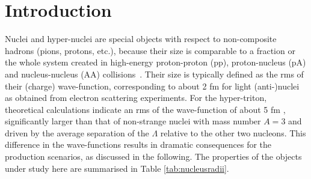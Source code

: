 \documentclass[%
 reprint,
 amsmath,amssymb,
 aps,
]{revtex4-1}
\begin{document}
\section{Introduction} 
Nuclei and hyper-nuclei are special objects with respect to non-composite hadrons (pions, protons, etc.), because their size is comparable to a fraction or the whole system created in high-energy proton-proton (pp), proton-nucleus (pA) and nucleus-nucleus (AA) collisions~\cite{Adam:2015vna}.  
Their size is typically defined as the rms of their (charge) wave-function, corresponding to about 2 fm for light (anti-)nuclei as obtained from electron scattering experiments. 
For the hyper-triton, theoretical calculations indicate an rms of the wave-function of about 5 fm \cite{Nemura:1999qp}, significantly larger than that of non-strange nuclei with mass number $A = 3$ and driven by the average separation of the $\Lambda$ relative to the other two nucleons. 
This difference in the wave-functions results in dramatic consequences for the production scenarios, as discussed in the following.
The properties of the objects under study here are summarised in Table \ref{tab:nucleusradii}.
\end{document}
